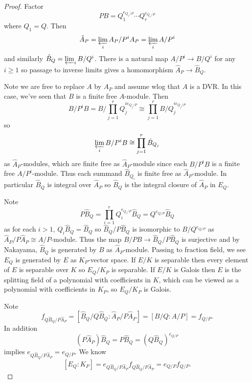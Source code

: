\documentclass[a4paper]{article}
\begin{document}
\begin{proof}
  Factor
  \[
    PB = Q_1^{e_{Q_1/P}} \cdots Q_r^{e_{Q_r/P}}
  \]
  where \(Q_1 = Q\). Then
  \[
    \hat A_P = \varprojlim_i A_P/P^iA_P = \varprojlim_i A/P^i
  \]
  and similarly \(\hat B_Q = \varprojlim_i B/Q^i\). There is a natural map \(A/P^i \to B/Q^i\) for any \(i \geq 1\) so passage to inverse limits gives a homomorphism \(\hat A_P \to \hat B_Q\).

  Note we are free to replace \(A\) by \(A_P\) and assume wlog that \(A\) is a DVR. In this case, we've seen that \(B\) is a finite free \(A\)-module. Then
  \[
    B/P^iB = B/\prod_{j = 1}^r Q_j^{i e_{Q_j/P}} \cong \prod_{j = 1}^r B/Q_j^{i e_{Q_j/P}}
  \]
  so
  \[
    \varprojlim_i B/P^iB \cong \prod_{j = 1}^r \hat B_{Q_j}
  \]
  as \(\hat A_P\)-modules, which are finite free as \(\hat A_P\)-module since each \(B/P^iB\) is a finite free \(A/P^i\)-module. Thus each summand \(\hat B_{Q_i}\) is finite free as \(\hat A_P\)-module. In particular \(\hat B_Q\) is integral over \(\hat A_P\) so \(\hat B_Q\) is the integral closure of \(\hat A_P\) in \(E_Q\).

  Note
  \[
    P\hat B_Q = \prod_{i = 1}^r Q_i^{e_{Q_i/P}} \hat B_Q = Q^{e_{Q/P}} \hat B_Q
  \]
  as for each \(i > 1\), \(Q_i \hat B_{Q} = \hat B_{Q}\) so \(\hat B_Q/P \hat B_Q\) is isomorphic to \(B/Q^{e_{Q/P}}\) as \(\hat A_P/P \hat A_P \cong A/P\)-module. Thus the map \(B/PB \to \hat B_Q/P\hat B_Q\) is surjective and by Nakayama, \(\hat B_Q\) is generated by \(B\) as \(\hat A_P\)-module. Passing to fraction field, we see \(E_Q\) is generated by \(E\) as \(K_P\)-vector space. If \(E/K\) is separable then every element of \(E\) is separable over \(K\) so \(E_Q/K_P\) is separable. If \(E/K\) is Galois then \(E\) is the splitting field of a polynomial with coefficients in \(K\), which can be viewed as a polynomial with coefficients in \(K_P\), so \(E_Q/K_P\) is Galois.

  Note
  \[
    f_{Q\hat B_Q/P\hat A_P} = [\hat B_Q/Q\hat B_Q: \hat A_P/P\hat A_P] = [B/Q: A/P] = f_{Q/P}.
  \]
  In addition
  \[
    (P \hat A_P) \hat B_Q = P \hat B_Q = (Q \hat B_Q)^{e_{Q/P}}
  \]
  implies \(e_{Q\hat B_Q/P \hat A_P} = e_{Q/P}\). We know
  \[
   [E_Q: K_P] = e_{Q\hat B_Q/P\hat A_P} f_{Q\hat B_Q/P\hat A_P} = e_{Q/P} f_{Q/P}.
  \]


\end{proof}
\end{document}
